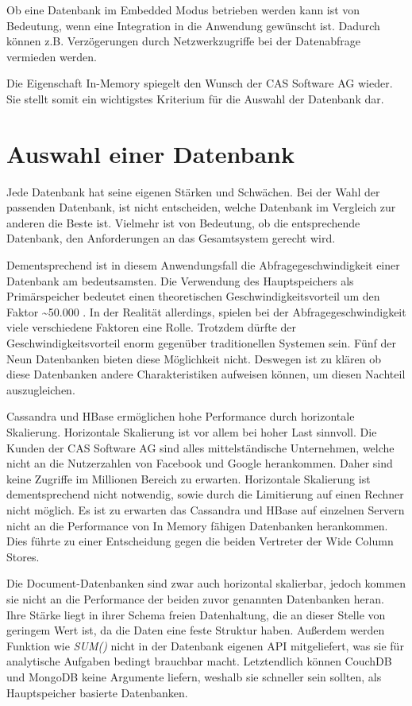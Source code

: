 Ob eine Datenbank im Embedded Modus betrieben werden kann ist von Bedeutung, wenn eine Integration in die Anwendung gewünscht ist. Dadurch können z.B. Verzögerungen durch Netzwerkzugriffe bei der Datenabfrage vermieden werden. 

Die Eigenschaft In-Memory spiegelt den Wunsch der CAS Software AG wieder. Sie stellt somit ein wichtigstes Kriterium für die Auswahl der Datenbank dar.

\section{Auswahl einer Datenbank}
\label{ch:AnalyseDatenbanken:sec:Ergebniss}

Jede Datenbank hat seine eigenen Stärken und Schwächen. Bei der Wahl der passenden Datenbank, ist nicht entscheiden, welche Datenbank im Vergleich zur anderen die Beste ist. Vielmehr ist von Bedeutung, ob die entsprechende Datenbank, den Anforderungen an das Gesamtsystem gerecht wird. 

Dementsprechend ist in diesem Anwendungsfall die Abfragegeschwindigkeit einer Datenbank am bedeutsamsten. Die Verwendung des Hauptspeichers als Primärspeicher bedeutet einen theoretischen Geschwindigkeitsvorteil um den Faktor \textasciitilde 50.000 \cite{SWB-394434307}.
In der Realität allerdings, spielen bei der Abfragegeschwindigkeit viele verschiedene Faktoren eine Rolle. Trotzdem dürfte der Geschwindigkeitsvorteil enorm gegenüber traditionellen Systemen sein. Fünf der Neun Datenbanken bieten diese Möglichkeit nicht. Deswegen ist zu klären ob diese Datenbanken andere Charakteristiken aufweisen können, um diesen Nachteil auszugleichen.

Cassandra und HBase ermöglichen hohe Performance durch horizontale Skalierung. Horizontale Skalierung ist vor allem bei hoher Last sinnvoll. Die Kunden der CAS Software AG sind alles mittelständische Unternehmen, welche nicht an die Nutzerzahlen von Facebook und Google herankommen. Daher sind keine Zugriffe im Millionen Bereich zu erwarten. Horizontale Skalierung ist dementsprechend nicht notwendig, sowie durch die Limitierung auf einen Rechner nicht möglich. Es ist zu erwarten das Cassandra und HBase auf einzelnen Servern nicht an die Performance von In Memory fähigen Datenbanken herankommen. Dies führte zu einer Entscheidung gegen die beiden Vertreter der Wide Column Stores.

Die Document-Datenbanken sind zwar auch horizontal skalierbar, jedoch kommen sie nicht an die Performance der beiden zuvor genannten Datenbanken heran. Ihre Stärke liegt in ihrer Schema freien Datenhaltung, die an dieser Stelle von geringem Wert ist, da die Daten eine feste Struktur haben. Außerdem werden Funktion wie \textit{SUM()} nicht in der Datenbank eigenen API mitgeliefert, was sie für analytische Aufgaben bedingt brauchbar macht. Letztendlich können CouchDB und MongoDB keine Argumente liefern, weshalb sie schneller sein sollten, als Hauptspeicher basierte Datenbanken.

